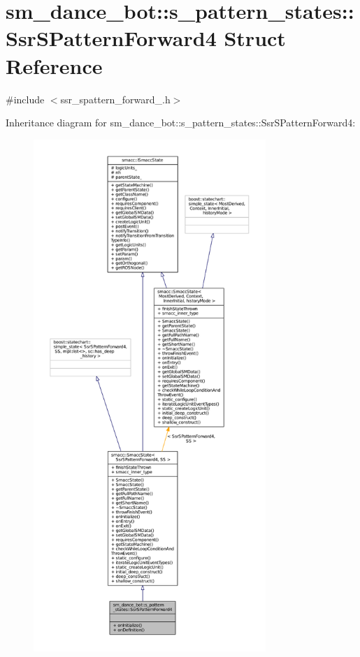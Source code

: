 \hypertarget{structsm__dance__bot_1_1s__pattern__states_1_1SsrSPatternForward4}{}\section{sm\+\_\+dance\+\_\+bot\+:\+:s\+\_\+pattern\+\_\+states\+:\+:Ssr\+S\+Pattern\+Forward4 Struct Reference}
\label{structsm__dance__bot_1_1s__pattern__states_1_1SsrSPatternForward4}


{\ttfamily \#include $<$ssr\+\_\+spattern\+\_\+forward\+\_.\+h$>$}



Inheritance diagram for sm\+\_\+dance\+\_\+bot\+:\+:s\+\_\+pattern\+\_\+states\+:\+:Ssr\+S\+Pattern\+Forward4\+:
\nopagebreak
\begin{figure}[H]
\begin{center}
\leavevmode
\includegraphics[height=550pt]{structsm__dance__bot_1_1s__pattern__states_1_1SsrSPatternForward4__inherit__graph}
\end{center}
\end{figure}


